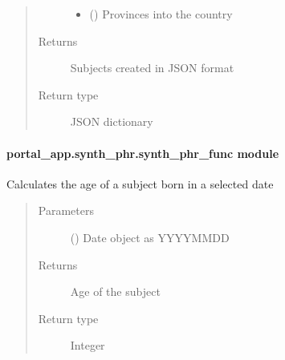 \documentclass[letterpaper,10pt,english]{sphinxmanual}
\begin{document}
\begin{fulllineitems}
\begin{quote}
\begin{description}
\begin{itemize}
\item {} 
\sphinxAtStartPar
{} () \textendash{} Provinces into the country

\end{itemize}

\item[{Returns}] \leavevmode
\sphinxAtStartPar
Subjects created in JSON format

\item[{Return type}] \leavevmode
\sphinxAtStartPar
JSON dictionary

\end{description}\end{quote}

\end{fulllineitems}



\paragraph{portal\_app.synth\_phr.synth\_phr\_func module}
\label{\detokenize{CE_app.synth_phr:module-CE_app.synth_phr.synth_phr_func}}\label{\detokenize{CE_app.synth_phr:portal-app-synth-phr-synth-phr-func-module}}

\begin{fulllineitems}
\label{\detokenize{CE_app.synth_phr:CE_app.synth_phr.synth_phr_func.func_nihpo_calculate_age}}
\sphinxAtStartPar
Calculates the age of a subject born in a selected date
\begin{quote}\begin{description}
\item[{Parameters}] \leavevmode
\sphinxAtStartPar
{} () \textendash{} Date object as YYYY\sphinxhyphen{}MM\sphinxhyphen{}DD

\item[{Returns}] \leavevmode
\sphinxAtStartPar
Age of the subject

\item[{Return type}] \leavevmode
\sphinxAtStartPar
Integer

\end{description}\end{quote}

\end{fulllineitems}
\end{document}
